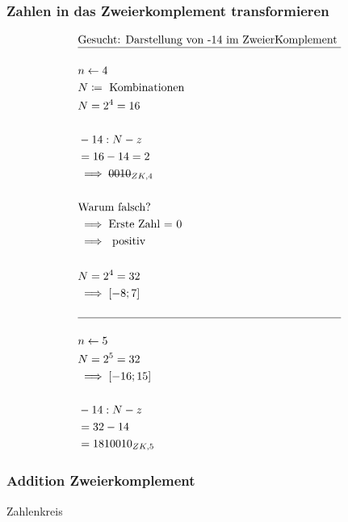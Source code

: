 \documentclass[a4paper]{scrartcl}
\begin{document}
				 \subsubsection{Zahlen in das Zweierkomplement transformieren}
				 \begin{align*}
				 	&\text{Gesucht: Darstellung von -14 im ZweierKomplement }
				 	\\ \hline \\
				 	&n \gets 4\\
				 	&N\coloneqq \text{ Kombinationen}\\
				 	&N = 2^4 = 16 \\
				 	\\
				 	&-14 : N-z\\ 
				 	&= 16-14=2\\ 
				 	& \implies \text{\st{$0010$}}_{ZK,4}\\
				 	\\
				 	&\text{Warum falsch?}\\
				 	& \implies \text{Erste Zahl = 0}\\
				 	& \implies \text{ positiv }\\
				 	\\
				 	& N= 2^4 = 32 \\
				 	& \implies [-8;7]\\
				 	\\ \hline \\
				 	&n \gets 5\\
				 	&N = 2^5 = 32\\
				 	& \implies [-16;15]\\
				 	\\
				 	&-14 : N - z\\
				 	& = 32-14 \\
				 	&= 18 10010_{ZK,5}\\
				 \end{align*}
				
				\subsubsection{Addition Zweierkomplement}
				Zahlenkreis\\
\end{document}
